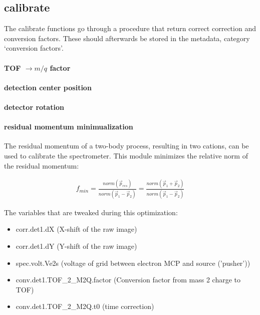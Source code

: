 \newpage
\subsection{calibrate}
The calibrate functions go through a procedure that return correct correction and conversion factors. These should afterwards be stored in the metadata, category `conversion factors'. 

\paragraph{TOF $\rightarrow m/q$ factor}

\paragraph{detection center position}

\paragraph{detector rotation}

\paragraph{residual momentum minimualization}
The residual momentum of a two-body process, resulting in two cations, can be used to calibrate the spectrometer. This module minimizes the relative norm of the residual momentum:

\begin{align}
f_{min} = \frac{norm(\vec{p}_{res})}{norm(\vec{p}_{1} - \vec{p}_{2})} = \frac{norm(\vec{p}_{1} + \vec{p}_{2})}{norm(\vec{p}_{1} - \vec{p}_{2})}
\end{align}

The variables that are tweaked during this optimization:

\begin{itemize}
\item corr.det1.dX	(X-shift of the raw image)
\item corr.det1.dY (Y-shift of the raw image)
\item spec.volt.Ve2s (voltage of grid between electron MCP and source ('pusher'))
\item conv.det1.TOF\_2\_M2Q.factor (Conversion factor from mass 2 charge to TOF) 
\item conv.det1.TOF\_2\_M2Q.t0 (time correction)
\end{itemize}

